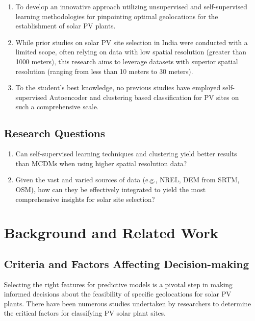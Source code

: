 \documentclass[a4paper,12pt]{Classes/RoboticsLaTeX}
\begin{document}
	\begin{enumerate}
		\item To develop an innovative approach utilizing unsupervised and self-supervised learning methodologies for pinpointing optimal geolocations for the establishment of solar PV plants.
		
		\item While prior studies on solar PV site selection in India were conducted with a limited scope, often relying on data with low spatial resolution (greater than 1000 meters), this research aims to leverage datasets with superior spatial resolution (ranging from less than 10 meters to 30 meters).
		
		\item To the student's best knowledge, no previous studies have employed self-supervised Autoencoder and clustering based classification for \ac{PV} sites on such a comprehensive scale.
	\end{enumerate}

	\section{Research Questions}

	\begin{enumerate}
		\item Can self-supervised learning techniques and clustering yield better results than \ac{MCDMs} when using higher spatial resolution data?
		\item Given the vast and varied sources of data (e.g., \ac{NREL}, \ac{DEM} from \ac{SRTM}, \ac{OSM}), how can they be effectively integrated to yield the most comprehensive insights for solar site selection?
	\end{enumerate}

	\chapter{Background and Related Work}
	
	\section{Criteria and Factors Affecting Decision-making}

	Selecting the right features for predictive models is a pivotal step in making informed decisions about the feasibility of specific geolocations for solar \ac{PV} plants. There have been numerous studies undertaken by researchers to determine the critical factors for classifying \ac{PV} solar plant sites.
\end{document}
